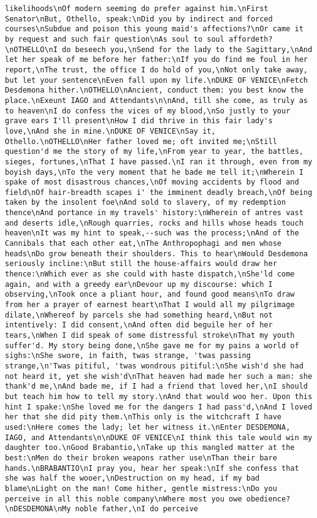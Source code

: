 \begin{verbatim}
likelihoods\nOf modern seeming do prefer against him.\nFirst Senator\nBut, Othello, speak:\nDid you by indirect and forced courses\nSubdue and poison this young maid's affections?\nOr came it by request and such fair question\nAs soul to soul affordeth?\nOTHELLO\nI do beseech you,\nSend for the lady to the Sagittary,\nAnd let her speak of me before her father:\nIf you do find me foul in her report,\nThe trust, the office I do hold of you,\nNot only take away, but let your sentence\nEven fall upon my life.\nDUKE OF VENICE\nFetch Desdemona hither.\nOTHELLO\nAncient, conduct them: you best know the place.\nExeunt IAGO and Attendants\n\nAnd, till she come, as truly as to heaven\nI do confess the vices of my blood,\nSo justly to your grave ears I'll present\nHow I did thrive in this fair lady's love,\nAnd she in mine.\nDUKE OF VENICE\nSay it, Othello.\nOTHELLO\nHer father loved me; oft invited me;\nStill question'd me the story of my life,\nFrom year to year, the battles, sieges, fortunes,\nThat I have passed.\nI ran it through, even from my boyish days,\nTo the very moment that he bade me tell it;\nWherein I spake of most disastrous chances,\nOf moving accidents by flood and field\nOf hair-breadth scapes i' the imminent deadly breach,\nOf being taken by the insolent foe\nAnd sold to slavery, of my redemption thence\nAnd portance in my travels' history:\nWherein of antres vast and deserts idle,\nRough quarries, rocks and hills whose heads touch heaven\nIt was my hint to speak,--such was the process;\nAnd of the Cannibals that each other eat,\nThe Anthropophagi and men whose heads\nDo grow beneath their shoulders. This to hear\nWould Desdemona seriously incline:\nBut still the house-affairs would draw her thence:\nWhich ever as she could with haste dispatch,\nShe'ld come again, and with a greedy ear\nDevour up my discourse: which I observing,\nTook once a pliant hour, and found good means\nTo draw from her a prayer of earnest heart\nThat I would all my pilgrimage dilate,\nWhereof by parcels she had something heard,\nBut not intentively: I did consent,\nAnd often did beguile her of her tears,\nWhen I did speak of some distressful stroke\nThat my youth suffer'd. My story being done,\nShe gave me for my pains a world of sighs:\nShe swore, in faith, twas strange, 'twas passing strange,\n'Twas pitiful, 'twas wondrous pitiful:\nShe wish'd she had not heard it, yet she wish'd\nThat heaven had made her such a man: she thank'd me,\nAnd bade me, if I had a friend that loved her,\nI should but teach him how to tell my story.\nAnd that would woo her. Upon this hint I spake:\nShe loved me for the dangers I had pass'd,\nAnd I loved her that she did pity them.\nThis only is the witchcraft I have used:\nHere comes the lady; let her witness it.\nEnter DESDEMONA, IAGO, and Attendants\n\nDUKE OF VENICE\nI think this tale would win my daughter too.\nGood Brabantio,\nTake up this mangled matter at the best:\nMen do their broken weapons rather use\nThan their bare hands.\nBRABANTIO\nI pray you, hear her speak:\nIf she confess that she was half the wooer,\nDestruction on my head, if my bad blame\nLight on the man! Come hither, gentle mistress:\nDo you perceive in all this noble company\nWhere most you owe obedience?\nDESDEMONA\nMy noble father,\nI do perceive 
\end{verbatim}
